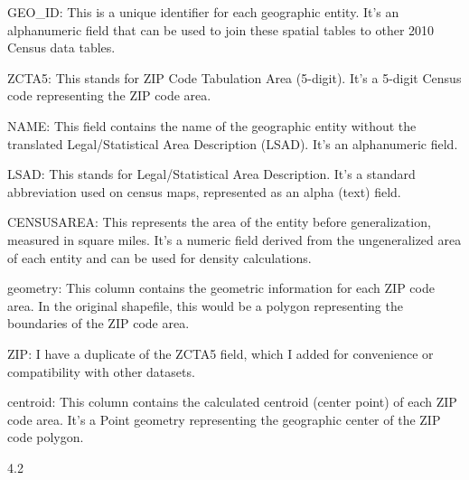 \documentclass[
  letterpaper,
  DIV=11,
  numbers=noendperiod]{scrartcl}
\begin{document}
GEO\_ID: This is a unique identifier for each geographic entity. It's an
alphanumeric field that can be used to join these spatial tables to
other 2010 Census data tables.

ZCTA5: This stands for ZIP Code Tabulation Area (5-digit). It's a
5-digit Census code representing the ZIP code area.

NAME: This field contains the name of the geographic entity without the
translated Legal/Statistical Area Description (LSAD). It's an
alphanumeric field.

LSAD: This stands for Legal/Statistical Area Description. It's a
standard abbreviation used on census maps, represented as an alpha
(text) field.

CENSUSAREA: This represents the area of the entity before
generalization, measured in square miles. It's a numeric field derived
from the ungeneralized area of each entity and can be used for density
calculations.

geometry: This column contains the geometric information for each ZIP
code area. In the original shapefile, this would be a polygon
representing the boundaries of the ZIP code area.

ZIP: I have a duplicate of the ZCTA5 field, which I added for
convenience or compatibility with other datasets.

centroid: This column contains the calculated centroid (center point) of
each ZIP code area. It's a Point geometry representing the geographic
center of the ZIP code polygon.

4.2
\end{document}

